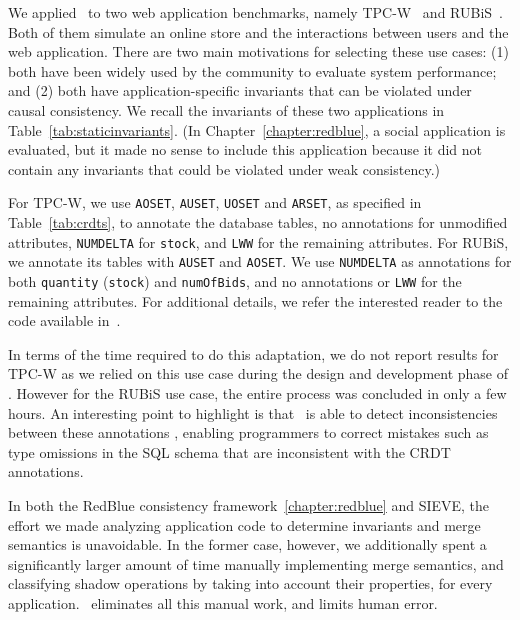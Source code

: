 We applied \tool\ to two web application benchmarks, namely TPC-W~\cite{TPC-Wv18}
and RUBiS~\cite{RUBiS}. Both of them simulate an online
store and the interactions between users and the web application. 
There are two main motivations for selecting these use cases: (1)
both have been widely used by the community to evaluate system performance; and
(2) both have application-specific invariants that can be violated 
under causal consistency. We recall the
invariants of these two applications in Table~\ref{tab:staticinvariants}. 
(In Chapter~\ref{chapter:redblue},
a social application is evaluated, but it made no sense to 
include this application because it
did not contain any invariants that could be violated under weak consistency.)

For TPC-W, we use \texttt{AOSET}, \texttt{AUSET}, \texttt{UOSET} and
\texttt{ARSET}, as specified in Table~\ref{tab:crdts}, to annotate the database tables,
no annotations for unmodified attributes, \texttt{NUMDELTA}
for \texttt{stock}, and \texttt{LWW} for the remaining attributes. For
RUBiS, we annotate its tables with \texttt{AUSET} and \texttt{AOSET}.
We use \texttt{NUMDELTA} as annotations for both \texttt{quantity} ({\tt stock}) and \texttt{numOfBids}, and
no annotations or \texttt{LWW} for the remaining attributes. For additional details, we refer the interested reader to the code available in~\cite{SIEVESampleData2014}.

In terms of the time required to do this adaptation, we do not report results
for TPC-W as we relied on this use case during the design and development phase
of \tool. However for the RUBiS use case, the entire process
was concluded in only a few hours.
An interesting point to highlight is that \tool\ is
able to detect inconsistencies between these annotations , enabling
programmers to  correct  mistakes such as type omissions in the SQL schema
that are inconsistent with the CRDT annotations.

In both the RedBlue consistency framework~\ref{chapter:redblue} and SIEVE,
the effort we made analyzing application code to determine
invariants and merge semantics is unavoidable. 
In the former case, however,
we additionally spent a significantly larger amount of time manually implementing 
merge semantics, and classifying shadow operations by taking into account their
properties, for every application. \tool\ eliminates
all this manual work, and limits human error.


